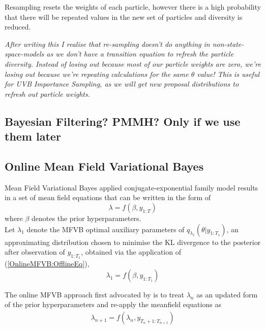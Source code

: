 \documentclass[
12pt, %
onehalfspacing, %
nohyperref, %
headsepline, %
chapterinoneline, %
]{MastersDoctoralThesis} %
\begin{document}
Resampling resets the weights of each particle, however there is a high probability that there will be repeated values in the new set of particles and diversity is reduced.

\textit{After writing this I realise that re-sampling doesn't do anything in non-state-space-models as we don't have a transition equation to refresh the particle diversity. Instead of losing out because most of our particle weights are zero, we're losing out because we're repeating calculations for the same $\theta$ value! This is useful for UVB Importance Sampling, as we will get new proposal distributions to refresh out particle weights.}

\fi

\subsection{Bayesian Filtering? PMMH? Only if we use them later}

\subsection{Online Mean Field Variational Bayes}
\label{subsec:OnlineMFVB}

Mean Field Variational Bayes applied conjugate-exponential family model results in a set of mean field equations that can be written in the form of 
\begin{equation}
\lambda = f(\beta, y_{1:T}) \label{OnlineMFVB:OfflineEq}
\end{equation}
where $\beta$ denotes the prior hyperparameters. 
\\

Let $\lambda_1$ denote the MFVB optimal auxiliary parameters of $q_{\lambda_1}(\theta | y_{1:T_1})$, an approximating distribution chosen to minimise the KL divergence to the posterior after observation of $y_{1:T_1}$, obtained via the application of (\ref{OnlineMFVB:OfflineEq}),
\begin{equation}
\lambda_1 = f(\beta, y_{1:T_1}) \label{OnlineMFVB:OnlineEq1}
\end{equation}

The online MFVB approach first advocated by \cite{Ghahramani2000b} is to treat $\lambda_n$ as an updated form of the prior hyperparameters and re-apply the meanfield equations as
\begin{align}
\lambda_{n+1} = f(\lambda_n, y_{T_n+1:T_{n+1}}) \label{OnlineMFVB:OnlineEq2}
\end{align}
\end{document}
